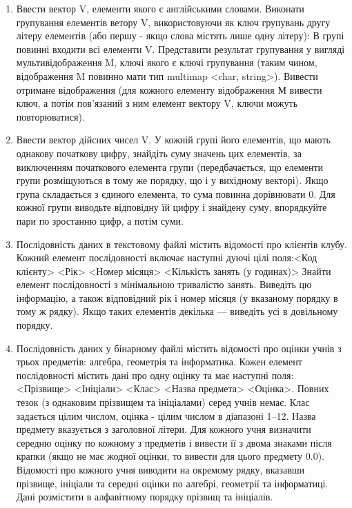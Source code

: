 \documentclass[a5paper,titlepage,openany,twoside,
]
{book_unv}%
\begin{document}
\begin{enumerate}
\item
Ввести вектор V, елементи якого є англійськими словами. 
Виконати групування елементів ветору V, використовуючи як ключ групувань 
другу літеру елементів (або першу - якщо слова містять лише одну літеру):
В групі повинні входити всі елементи V. Представити результат групування
у вигляді мультивідображення M, ключі якого є ключі
групування (таким чином, відображення M повинно мати тип multimap <char, string>).
Вивести отримане відображення (для кожного елементу відображення
М вивести ключ, а потім пов'язаний з ним елемент вектору V,
 ключи можуть повторюватися).

\item
Ввести вектор дійсних чисел V. У кожній групі його елементів, що мають однакову початкову цифру,
 знайдіть суму значень цих елементів, за виключенням початкового елемента групи (передбачається, що
елементи групи розміщуються в тому же порядку, що і у вихідному
векторі). Якщо група складається з єдиного елемента, то сума
повинна дорівнювати 0. Для кожної групи виводьте відповідну
їй цифру і знайдену суму, впорядкуйте пари по зростанню цифр, а потім суми. 

\item
Послідовність даних в текстовому файлі містить відомості про клієнтів
клубу. Кожний елемент послідовності включає наступні
дуючі цілі поля:<Код клієнту> <Рік> <Номер місяця> <Кількість занять (у годинах)>
Знайти елемент послідовності з мінімальною тривалістю занять.
 Виведіть цю інформацію, а також відповідний рік і номер місяця 
(у вказаному порядку в тому ж рядку).
Якщо таких елементів декілька --- виведіть усі в довільному порядку.

\item
Послідовність даних у бінарному файлі містить відомості про оцінки
учнів з трьох предметів: алгебра, геометрія та інформатика.
Кожен елемент послідовності містить дані про одну
оцінку та має наступні поля:
<Прізвище> <Ініціали> <Клас> <Назва предмета> <Оцінка>. 
Повних тезок (з однаковим прізвищем та ініціалами)
серед учнів немає. Клас задається цілим числом, оцінка - цілим
числом в діапазоні 1–12. Назва предмету вказується з заголовної
літери. Для кожного учня визначити середню оцінку по кожному з предметів і
 вивести її з двома знаками після крапки (якщо не має жодної оцінки, то вивести
 для цього предмету 0.0). Відомості про кожного учня виводити
на окремому рядку, вказавши прізвище, ініціали та середні оцінки
по алгебрі, геометрії та інформатиці. Дані розмістити в алфавітному порядку
прізвищ та ініціалів. 


\end{enumerate}
\end{document}
